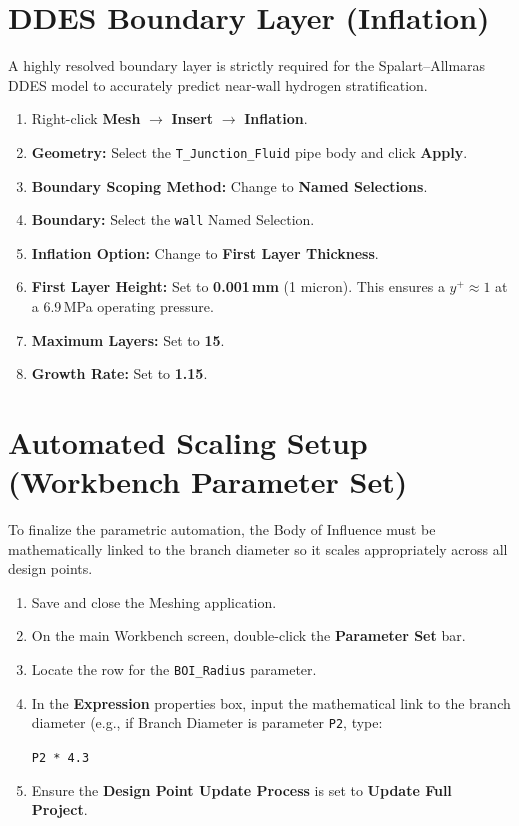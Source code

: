 \documentclass[12pt,a4paper]{report}
\begin{document}
\section{DDES Boundary Layer (Inflation)}

A highly resolved boundary layer is strictly required for the Spalart--Allmaras DDES model to accurately predict near-wall hydrogen stratification.

\begin{enumerate}
  \item Right-click \textbf{Mesh} $\rightarrow$ \textbf{Insert} $\rightarrow$ \textbf{Inflation}.
  \item \textbf{Geometry:} Select the \texttt{T\_Junction\_Fluid} pipe body and click \textbf{Apply}.
  \item \textbf{Boundary Scoping Method:} Change to \textbf{Named Selections}.
  \item \textbf{Boundary:} Select the \texttt{wall} Named Selection.
  \item \textbf{Inflation Option:} Change to \textbf{First Layer Thickness}.
  \item \textbf{First Layer Height:} Set to \textbf{0.001\,mm} (1 micron). This ensures a $y^+ \approx 1$ at a 6.9\,MPa operating pressure.
  \item \textbf{Maximum Layers:} Set to \textbf{15}.
  \item \textbf{Growth Rate:} Set to \textbf{1.15}.
\end{enumerate}


\section{Automated Scaling Setup (Workbench Parameter Set)}

To finalize the parametric automation, the Body of Influence must be mathematically linked to the branch diameter so it scales appropriately across all design points.

\begin{enumerate}
  \item Save and close the Meshing application.
  \item On the main Workbench screen, double-click the \textbf{Parameter Set} bar.
  \item Locate the row for the \texttt{BOI\_Radius} parameter.
  \item In the \textbf{Expression} properties box, input the mathematical link to the branch diameter (e.g., if Branch Diameter is parameter \texttt{P2}, type:

\begin{center}
\texttt{P2 * 4.3}
\end{center}

  \item Ensure the \textbf{Design Point Update Process} is set to \textbf{Update Full Project}.
\end{enumerate}
\end{document}
